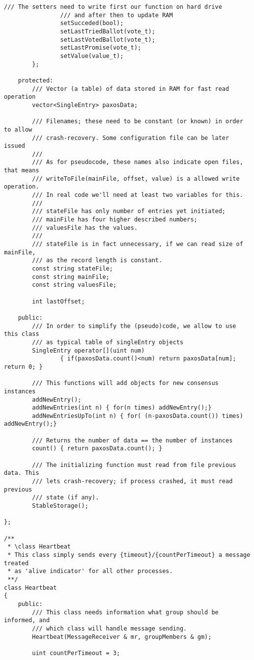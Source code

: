 {\begin{lstlisting}[frame=lines,caption=Pseudocode of Paxos algorithm]
				/// The setters need to write first our function on hard drive
				/// and after then to update RAM
				setSucceded(bool);
				setLastTriedBallot(vote_t);
				setLastVotedBallot(vote_t);
				setLastPromise(vote_t);
				setValue(value_t);
		};

	protected:
		/// Vector (a table) of data stored in RAM for fast read operation
		vector<SingleEntry> paxosData;

		/// Filenames; these need to be constant (or known) in order to allow
		/// crash-recovery. Some configuration file can be later issued
		///
		/// As for pseudocode, these names also indicate open files, that means
		/// writeToFile(mainFile, offset, value) is a allowed write operation.
		/// In real code we'll need at least two variables for this.
		///
		/// stateFile has only number of entries yet initiated;
		/// mainFile has four higher described numbers;
		/// valuesFile has the values.
		///
		/// stateFile is in fact unnecessary, if we can read size of mainFile,
		/// as the record length is constant.
		const string stateFile;
		const string mainFile;
		const string valuesFile;

		int lastOffset;

	public:
		/// In order to simplify the (pseudo)code, we allow to use this class
		/// as typical table of singleEntry objects
		SingleEntry operator[](uint num)
				{ if(paxosData.count()<num) return paxosData[num]; return 0; }

		/// This functions will add objects for new consensus instances
		addNewEntry();
		addNewEntries(int n) { for(n times) addNewEntry();}
		addNewEntriesUpTo(int n) { for( (n-paxosData.count()) times) addNewEntry();}

		/// Returns the number of data == the number of instances
		count() { return paxosData.count(); }

		/// The initializing function must read from file previous data. This
		/// lets crash-recovery; if process crashed, it must read previous
		/// state (if any).
		StableStorage();

};

/**
 * \class Heartbeat
 * This class simply sends every {timeout}/{countPerTimeout} a message treated
 * as 'alive indicator' for all other processes.
 **/
class Heartbeat
{
	public:
		/// This class needs information what group should be informed, and
		/// which class will handle message sending.
		Heartbeat(MessageReceiver & mr, groupMembers & gm);
		
		uint countPerTimeout = 3;
	

\end{lstlisting}}
